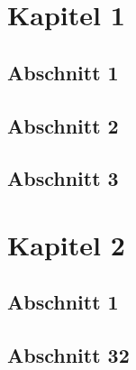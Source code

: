 \documentclass[
	a4paper,
	pagesize,
	pdftex,
	12pt,
	twoside, %
	BCOR=5mm, %
	ngerman,
	fleqn,
	final,
	abstract=on,
	bibliography=totoc,
]{scrreprt}
\begin{document}

	\begin{abstract}
		\lipsum[1]
	\end{abstract}

	\chapter{Kapitel 1}
	\section{Abschnitt 1}
	\lipsum[1-3]
	
	\section{Abschnitt 2}
	\lipsum[3-5]
	
	\section{Abschnitt 3}
	\lipsum[2-4]
	
	\chapter{Kapitel 2}
	\section{Abschnitt 1}
	\lipsum[1-2]
	
	\section{Abschnitt 32}
	\lipsum[6-9]

	\newpage
	
\end{document}
